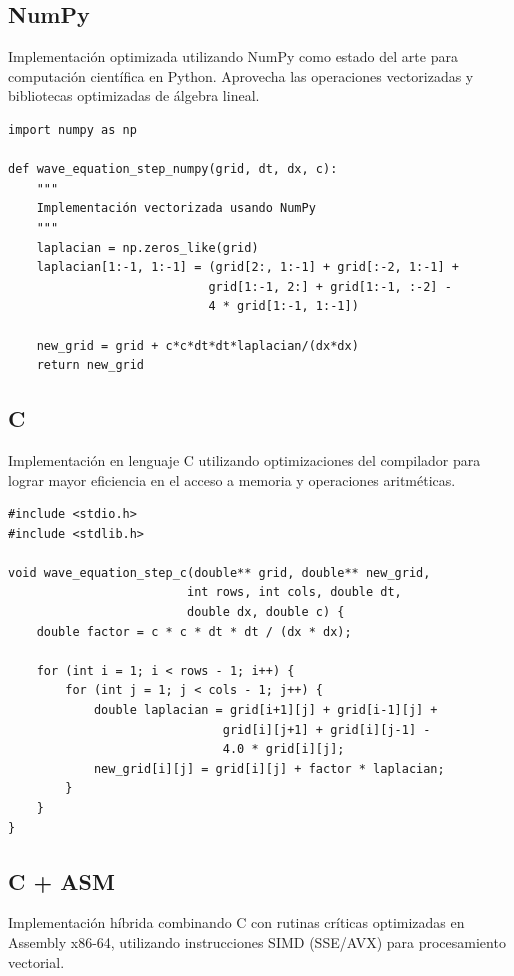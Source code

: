 \documentclass[a4paper]{article}
\begin{document}
\subsection{NumPy}

Implementación optimizada utilizando NumPy como estado del arte para computación científica en Python. Aprovecha las operaciones vectorizadas y bibliotecas optimizadas de álgebra lineal.

\begin{verbatim}
import numpy as np

def wave_equation_step_numpy(grid, dt, dx, c):
    """
    Implementación vectorizada usando NumPy
    """
    laplacian = np.zeros_like(grid)
    laplacian[1:-1, 1:-1] = (grid[2:, 1:-1] + grid[:-2, 1:-1] + 
                            grid[1:-1, 2:] + grid[1:-1, :-2] - 
                            4 * grid[1:-1, 1:-1])
    
    new_grid = grid + c*c*dt*dt*laplacian/(dx*dx)
    return new_grid
\end{verbatim}

\subsection{C}

Implementación en lenguaje C utilizando optimizaciones del compilador para lograr mayor eficiencia en el acceso a memoria y operaciones aritméticas.

\begin{verbatim}
#include <stdio.h>
#include <stdlib.h>

void wave_equation_step_c(double** grid, double** new_grid, 
                         int rows, int cols, double dt, 
                         double dx, double c) {
    double factor = c * c * dt * dt / (dx * dx);
    
    for (int i = 1; i < rows - 1; i++) {
        for (int j = 1; j < cols - 1; j++) {
            double laplacian = grid[i+1][j] + grid[i-1][j] + 
                              grid[i][j+1] + grid[i][j-1] - 
                              4.0 * grid[i][j];
            new_grid[i][j] = grid[i][j] + factor * laplacian;
        }
    }
}
\end{verbatim}

\subsection{C + ASM}

Implementación híbrida combinando C con rutinas críticas optimizadas en Assembly x86-64, utilizando instrucciones SIMD (SSE/AVX) para procesamiento vectorial.
\end{document}
